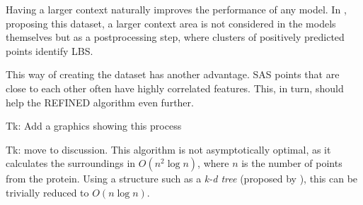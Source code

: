 Having a larger context naturally improves the performance of any model. In \cite{P2RANK}, proposing this dataset, a larger context area is not considered in the models themselves but as a postprocessing step, where clusters of positively predicted points identify LBS.

This way of creating the dataset has another advantage. SAS points that are close to each other often have highly correlated features. This, in turn, should help the REFINED algorithm even further.

Tk: Add a graphics showing this process

Tk: move to discussion.
This algorithm is not asymptotically optimal, as it calculates the surroundings in $O(n^2 \log{n})$, where $n$ is the number of points from the protein. Using a structure such as a \textit{k-d tree} (proposed by \cite{kd-tree}), this can be trivially reduced to $O(n \log{n})$. 